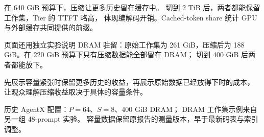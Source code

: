 \documentclass[UTF8,fontset=none,a4paper,11pt]{ctexart}
\newcommand{\source}[1]{{\footnotesize\color{fpInk!65}#1\par}}
\begin{document}
在 640 GiB 预算下，压缩让更多历史留在缓存中。
切到 2 TiB 后，两者都能保留工作集，Tier 的 TTFT 略高，
体现编解码开销。Cached-token share 统计 GPU 与外部缓存共同提供的前缀。

页面还用独立实验说明 DRAM 驻留：原始工作集为 261 GiB，压缩后为
188 GiB。在 220 GiB 预算下只有压缩数据能全部留在 DRAM；
切到 400 GiB 后两者都能放下。

\begin{messagebox}
先展示容量紧张时保留更多历史的收益，再展示原始数据已经放得下时的成本，
让观众理解压缩收益取决于具体的容量条件。
\end{messagebox}

\source{历史 AgentX 配置：$P=64$、$S=8$、400 GiB DRAM；
DRAM 工作集示例来自另一组 48-prompt 实验。
容量数据保留原报告的测量版本，早于最新码表与索引调整。}
\end{document}
